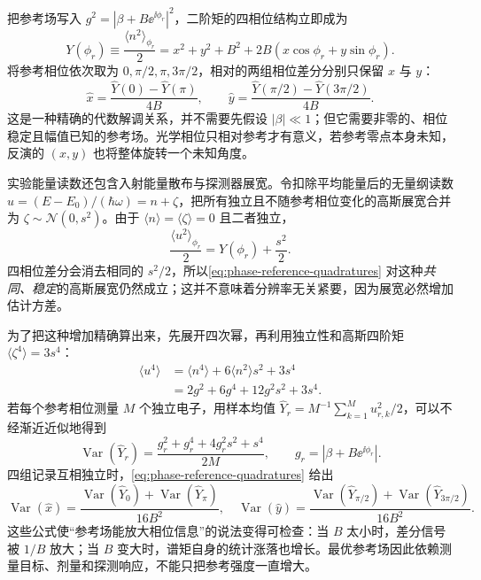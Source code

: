 把参考场写入 $g^2=|\beta+B\ee^{\ii\phi_r}|^2$，二阶矩的四相位结构立即成为
\begin{equation}
Y(\phi_r)\equiv\frac{\langle n^2\rangle_{\phi_r}}{2}
=x^2+y^2+B^2+2B(x\cos\phi_r+y\sin\phi_r).
\label{eq:phase-reference-second-moment}
\end{equation}
将参考相位依次取为 $0,\pi/2,\pi,3\pi/2$，相对的两组相位差分分别只保留 $x$ 与 $y$：
\begin{equation}
\widehat x=\frac{\widehat Y(0)-\widehat Y(\pi)}{4B},\qquad
\widehat y=\frac{\widehat Y(\pi/2)-\widehat Y(3\pi/2)}{4B}.
\label{eq:phase-reference-quadratures}
\end{equation}
这是一种精确的代数解调关系，并不需要先假设 $|\beta|\ll1$；但它需要非零的、相位稳定且幅值已知的参考场。光学相位只相对参考才有意义，若参考零点本身未知，反演的 $(x,y)$ 也将整体旋转一个未知角度。

实验能量读数还包含入射能量散布与探测器展宽。令扣除平均能量后的无量纲读数 $u=(E-E_0)/(\hbar\omega)=n+\zeta$，把所有独立且不随参考相位变化的高斯展宽合并为 $\zeta\sim\mathcal N(0,s^2)$。由于 $\langle n\rangle=\langle\zeta\rangle=0$ 且二者独立，
\begin{equation}
\frac{\langle u^2\rangle_{\phi_r}}{2}
=Y(\phi_r)+\frac{s^2}{2}.
\label{eq:phase-reference-blurred-moment}
\end{equation}
四相位差分会消去相同的 $s^2/2$，所以\cref{eq:phase-reference-quadratures} 对这种\emph{共同、稳定}的高斯展宽仍然成立；这并不意味着分辨率无关紧要，因为展宽必然增加估计方差。

为了把这种增加精确算出来，先展开四次幂，再利用独立性和高斯四阶矩 $\langle\zeta^4\rangle=3s^4$：
\begin{align*}
\langle u^4\rangle
&=\langle n^4\rangle+6\langle n^2\rangle s^2+3s^4\\
&=2g^2+6g^4+12g^2s^2+3s^4.
\end{align*}
若每个参考相位测量 $M$ 个独立电子，用样本均值
$\widehat Y_r=M^{-1}\sum_{k=1}^M u_{r,k}^2/2$，可以不经渐近近似地得到
\begin{equation}
\operatorname{Var}(\widehat Y_r)=
\frac{g_r^2+g_r^4+4g_r^2s^2+s^4}{2M},\qquad
 g_r=|\beta+B\ee^{\ii\phi_r}|.
\label{eq:phase-reference-moment-variance}
\end{equation}
四组记录互相独立时，\cref{eq:phase-reference-quadratures} 给出
\[
\operatorname{Var}(\widehat x)=\frac{\operatorname{Var}(\widehat Y_0)+\operatorname{Var}(\widehat Y_{\pi})}{16B^2},\quad
\operatorname{Var}(\widehat y)=\frac{\operatorname{Var}(\widehat Y_{\pi/2})+\operatorname{Var}(\widehat Y_{3\pi/2})}{16B^2}.
\]
这些公式使“参考场能放大相位信息”的说法变得可检查：当 $B$ 太小时，差分信号被 $1/B$ 放大；当 $B$ 变大时，谱矩自身的统计涨落也增长。最优参考场因此依赖测量目标、剂量和探测响应，不能只把参考强度一直增大。

